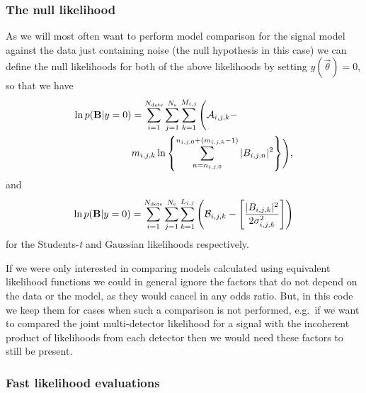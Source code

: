 \subsubsection{The null likelihood}

As we will most often want to perform model comparison for the signal model against the data just containing
noise (the null hypothesis in this case) we can define the null likelihoods for both of the above likelihoods
by setting $y(\vec{\theta}) = 0$, so that we have
\begin{align}
\ln{p(\mathbf{B}|y=0)} &= \sum_{i=1}^{N_{\rm dets}} \sum_{j=1}^{N_{\rm s}}
\sum_{k=1}^{M_{i,j}} \Bigg( \mathcal{A}_{i,j,k} - \nonumber \\
&m_{i,j,k}\ln{
\left\{\sum_{n=n_{i,j,0}}^{n_{i,j,0}+(m_{i,j,k}-1)} |B_{i,j,n}|^2\right\}}
\Bigg),
\end{align}
and
\begin{equation}
\ln{p(\mathbf{B}|y=0)} = \sum_{i=1}^{N_{\rm dets}} \sum_{j=1}^{N_{\rm s}}
\sum_{k=1}^{L_{i,j}} \left(\mathcal{B}_{i,j,k} -
\left[\frac{|B_{i,j,k}|^2}{2\sigma_{i,j,k}^2 } \right] \right)
\end{equation}
for the Students-{\it t} and Gaussian likelihoods respectively.

If we were only interested in comparing models calculated using equivalent likelihood functions we could in
general ignore the factors that do not depend on the data or the model, as they would cancel in any odds
ratio. But, in this code we keep them for cases when such a comparison is not performed, e.g.\ if we
want to compared the joint multi-detector likelihood for a signal with the incoherent product of likelihoods
from each detector then we would need these factors to still be present.

\subsubsection{Fast likelihood evaluations}

